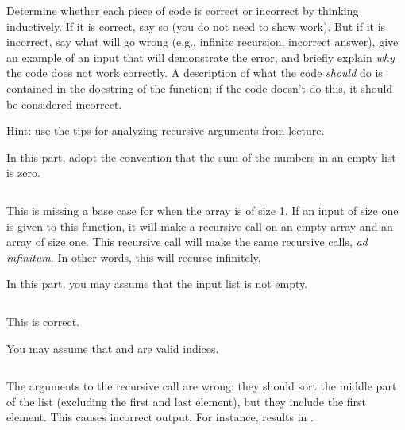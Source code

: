 \begin{prob}
    Determine whether each piece of code is correct or
    incorrect by thinking inductively. If it is correct, say so (you do not
    need to show work). But if it is incorrect, say what will go wrong (e.g.,
    infinite recursion, incorrect answer), give an example of an input that
    will demonstrate the error, and briefly explain \emph{why} the code does not
    work correctly. A description of what the code \emph{should} do is contained in the
    docstring of the function; if the code doesn't do this, it should be considered incorrect.

    Hint: use the tips for analyzing recursive arguments from lecture.


    \begin{subprobset}
        \begin{subprob}
            In this part, adopt the convention that the sum of the numbers in an empty
            list is zero.

            \inputminted{python}{\thisdir/include/part_a.py}

            \begin{soln}
                This is missing a base case for when the array is of size 1. If
                an input of size one is given to this function, it will make a
                recursive call on an empty array and an array of size one. This
                recursive call will make the same recursive calls, \emph{ad
                infinitum}. In other words, this will recurse infinitely.
            \end{soln}
        \end{subprob}

        \begin{subprob}
            In this part, you may assume that the input list is not empty.

            \inputminted{python}{\thisdir/include/part_b.py}

            \begin{soln}
                This is correct.
            \end{soln}
        \end{subprob}

        \begin{subprob}
            You may assume that  and  are valid indices.

            \inputminted{python}{\thisdir/include/part_c.py}

            \begin{soln}
                The arguments to the recursive call are wrong: they should sort the middle part
                of the list (excluding the first and last element), but they include the first
                element. This causes incorrect output. For instance,  results in
                \python{[5,2,3,4]}.
            \end{soln}
        \end{subprob}



\end{subprobset}
\end{prob}
